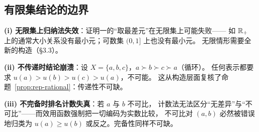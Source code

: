 \subsection{有限集结论的边界}

\begin{remark}[三个容易误推的扩展]\label{rem:finite-boundary}
\textbf{(i) 无限集上归纳法失效}：证明一的“取最差元”在无限集上可能失败——
如 $\mathbb{R}_+$ 上的通常大小关系没有最小元；可数集 $(0,1]$ 上也没有最小元。
无限情形需要全新的构造（§3.3）。

\textbf{(ii) 不传递时结论崩溃}：设 $X=\{a,b,c\}$，$a\succ b\succ c\succ a$（循环）。
任何表示都要求 $u(a)>u(b)>u(c)>u(a)$，不可能。
这从构造层面复核了命题~\ref{prop:rep-rational}：传递性不可缺。

\textbf{(iii) 不完备时排名计数失真}：若 $a$ 与 $b$ 不可比，
计数法无法区分“无差异”与“不可比”——而效用函数强制把一切编码为实数比较，
不可比对 $(a,b)$ 必然被错误地归类为 $u(a)\ge u(b)$ 或反之。完备性同样不可缺。
\end{remark}
